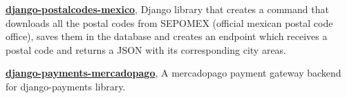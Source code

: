 

\begin{cvpubs}

  \cvpub
    {
      \begin{cvlist}
        \item {\textbf{\href{https://pypi.org/project/django-postalcodes-mexico/}{django-postalcodes-mexico}}, Django library that creates a command that downloads all the postal codes from SEPOMEX (official mexican postal code office), saves them in the database and creates an endpoint which receives a postal code and returns a JSON with its corresponding city areas.}
        \item {\textbf{\href{https://pypi.org/project/django-payments-mercadopago/}{django-payments-mercadopago}}, A mercadopago payment gateway backend for django-payments library. }
      \end{cvlist}
    }
\vspace{-1pt}
\end{cvpubs}
